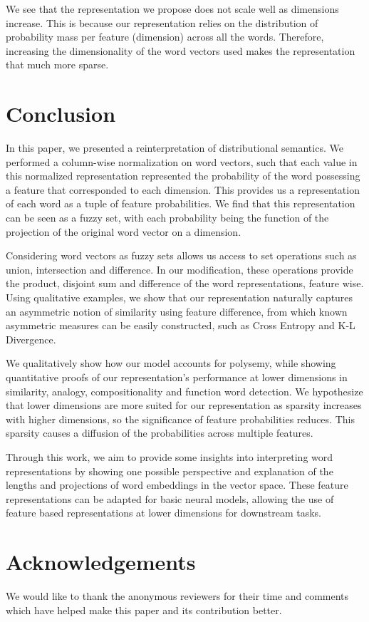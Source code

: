 \documentclass[11pt,a4paper]{article}
\begin{document}
We see that the representation we propose does not scale well as dimensions increase. This is because our representation relies on the distribution of probability mass per feature (dimension) across all the words. Therefore, increasing the dimensionality of the word vectors used makes the representation that much more sparse.

\section{Conclusion}
\label{sec: conclusion}

In this paper, we presented a reinterpretation of distributional semantics. We performed a column-wise normalization on word vectors, such that each value in this normalized representation represented the probability of the word possessing a feature that corresponded to each dimension. This provides us a representation of each word as a tuple of feature probabilities. We find that this representation can be seen as a fuzzy set, with each probability being the function of the projection of the original word vector on a dimension.

Considering word vectors as fuzzy sets allows us access to set operations such as union, intersection and difference. In our modification, these operations provide the product, disjoint sum and difference of the word representations, feature wise. Using qualitative examples, we show that our representation naturally captures an asymmetric notion of similarity using feature difference, from which known asymmetric measures can be easily constructed, such as Cross Entropy and K-L Divergence.

We qualitatively show how our model accounts for polysemy, while showing quantitative proofs of our representation's performance at lower dimensions in similarity, analogy, compositionality and function word detection. We hypothesize that lower dimensions are more suited for our representation as sparsity increases with higher dimensions, so the significance of feature probabilities reduces. This sparsity causes a diffusion of the probabilities across multiple features. 

Through this work, we aim to provide some insights into interpreting word representations by showing one possible perspective and explanation of the lengths and projections of word embeddings in the vector space. These feature representations can be adapted for basic neural models, allowing the use of feature based representations at lower dimensions for downstream tasks.

\section*{Acknowledgements}

We would like to thank the anonymous reviewers for their time and comments which have helped make this paper and its contribution better.



\end{document}
